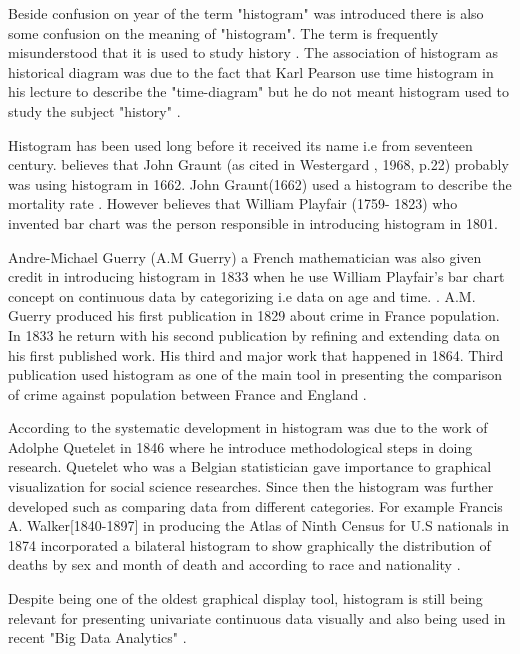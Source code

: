 Beside confusion on year of the term "histogram" was introduced there is also some confusion on the meaning of "histogram". The term is frequently misunderstood that it is used to study history \cite[]{rufilanchas2017origin}.  The association of histogram as historical diagram was due to the fact that Karl Pearson use time histogram in his lecture to describe the "time-diagram" but he do not meant histogram used to study the subject "history" \cite[]{rufilanchas2017origin}.

Histogram has been used long before it received its name i.e from seventeen century. \cite[]{scott1979optimal,loquin2008histogram} believes that John Graunt (as cited in Westergard , 1968, p.22) probably was using histogram in 1662. John Graunt(1662) used a histogram to describe the mortality rate \cite[]{copas1983non,scott2005multidimensional}.  However \cite[]{chen2007handbook,ross2010introductory,rufilanchas2017origin} believes that William Playfair (1759- 1823) who invented bar chart was the person responsible in introducing histogram in 1801.  

Andre-Michael Guerry (A.M Guerry) a French mathematician was also given credit in introducing histogram in 1833 when he use William Playfair's bar chart concept on continuous data by categorizing i.e data on age and time. \cite[]{beniger1976history,friendly2007m,ross2010introductory}. A.M. Guerry produced his first publication in 1829 about crime in France population. In 1833 he return with his second publication by refining and extending data on his first published work. His third and major work that happened in 1864. Third publication used histogram as one of the main tool in presenting the comparison of crime against population between France and England \cite[]{friendly2007m}.

According to \cite[]{ross2010introductory} the systematic development in histogram was due to the work of Adolphe Quetelet in 1846 where he introduce methodological steps in doing research. Quetelet who was a Belgian statistician gave importance to graphical visualization for social science researches. Since then the histogram was further developed such as comparing data from different categories. For example Francis A. Walker[1840-1897] in producing the Atlas of Ninth Census for U.S nationals in 1874 incorporated a bilateral histogram to show graphically the distribution of deaths by sex and month of death and according to race and nationality \cite[]{beniger1976history, friendly2008golden}. 

Despite being one of the oldest graphical display tool, histogram is still being relevant for presenting univariate continuous data  visually \cite[]{scott1979optimal, wand1997data} and also being used in recent "Big Data Analytics" \cite[]{berger2016big}.

